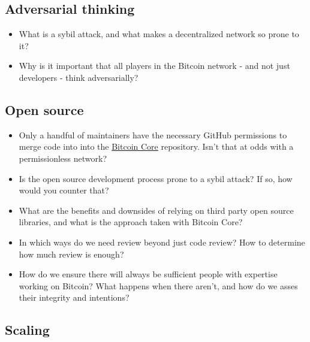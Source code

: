 \hypertarget{_adversarial_thinking}{%
\subsection{Adversarial thinking}\label{_adversarial_thinking}}

\begin{itemize}
\item
  What is a sybil attack, and what makes a decentralized network so
  prone to it?
\item
  Why is it important that all players in the Bitcoin network - and not
  just developers - think adversarially?
\end{itemize}

\hypertarget{_open_source}{%
\subsection{Open source}\label{_open_source}}

\begin{itemize}
\item
  Only a handful of maintainers have the necessary GitHub permissions to
  merge code into into the
  \href{https://github.com/bitcoin/bitcoin}{Bitcoin Core} repository.
  Isn't that at odds with a permissionless network?
\item
  Is the open source development process prone to a sybil attack? If so,
  how would you counter that?
\item
  What are the benefits and downsides of relying on third party open
  source libraries, and what is the approach taken with Bitcoin Core?
\item
  In which ways do we need review beyond just code review? How to
  determine how much review is enough?
\item
  How do we ensure there will always be sufficient people with expertise
  working on Bitcoin? What happens when there aren't, and how do we
  asses their integrity and intentions?
\end{itemize}

\hypertarget{_scaling}{%
\subsection{Scaling}\label{_scaling}}

